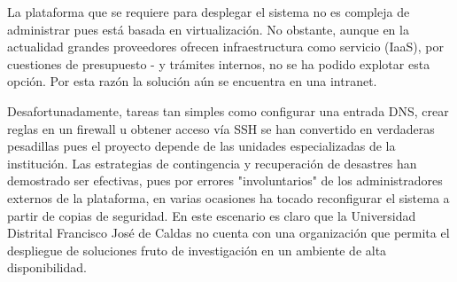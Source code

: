 La plataforma que se requiere para desplegar el sistema no es compleja de administrar pues está basada en virtualización. No obstante, aunque en la actualidad grandes proveedores ofrecen infraestructura como servicio (IaaS), por cuestiones de presupuesto - y trámites internos, no se ha podido explotar esta opción. Por esta razón la solución aún se encuentra en una intranet. 

Desafortunadamente, tareas tan simples como configurar una entrada DNS, crear reglas en un firewall u obtener acceso vía SSH se han convertido en verdaderas pesadillas pues el proyecto depende de las unidades especializadas de la institución. Las estrategias de contingencia y recuperación de desastres han demostrado ser efectivas, pues por errores "involuntarios" de los administradores externos de la plataforma, en varias ocasiones ha tocado reconfigurar el sistema a partir de copias de seguridad. En este escenario es claro que la Universidad Distrital Francisco José de Caldas no cuenta con una organización que permita el despliegue de soluciones fruto de investigación en un ambiente de alta disponibilidad.
